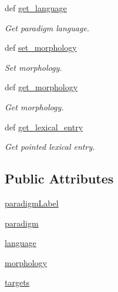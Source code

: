 \begin{DoxyCompactItemize}
def \hyperlink{classlmf_1_1src_1_1morphosyntax_1_1paradigm_1_1_paradigm_a7ba7ef75fdd20edfddc8821c7d4eca9a}{get\+\_\+language}
\begin{DoxyCompactList}\small\item\em Get paradigm language. \end{DoxyCompactList}\item 
def \hyperlink{classlmf_1_1src_1_1morphosyntax_1_1paradigm_1_1_paradigm_a40a98ba766025f62f839299c4084666c}{set\+\_\+morphology}
\begin{DoxyCompactList}\small\item\em Set morphology. \end{DoxyCompactList}\item 
def \hyperlink{classlmf_1_1src_1_1morphosyntax_1_1paradigm_1_1_paradigm_a7f8b86d83993a56e5dd46a7924f130b4}{get\+\_\+morphology}
\begin{DoxyCompactList}\small\item\em Get morphology. \end{DoxyCompactList}\item 
def \hyperlink{classlmf_1_1src_1_1morphosyntax_1_1paradigm_1_1_paradigm_aa9cc39604cd3b3d06e1d142016db3541}{get\+\_\+lexical\+\_\+entry}
\begin{DoxyCompactList}\small\item\em Get pointed lexical entry. \end{DoxyCompactList}\end{DoxyCompactItemize}
\subsection*{Public Attributes}
\begin{DoxyCompactItemize}
\item 
\hyperlink{classlmf_1_1src_1_1morphosyntax_1_1paradigm_1_1_paradigm_a5892a515d2311d4c03b180603a0d2929}{paradigm\+Label}
\item 
\hyperlink{classlmf_1_1src_1_1morphosyntax_1_1paradigm_1_1_paradigm_a2c706c0653324f536c9fc8b20d5dbf15}{paradigm}
\item 
\hyperlink{classlmf_1_1src_1_1morphosyntax_1_1paradigm_1_1_paradigm_a536c9155740d0363044389ce31dff090}{language}
\item 
\hyperlink{classlmf_1_1src_1_1morphosyntax_1_1paradigm_1_1_paradigm_a7c9c944b764a0351f0e58234b48bdf86}{morphology}
\item 
\hyperlink{classlmf_1_1src_1_1morphosyntax_1_1paradigm_1_1_paradigm_a546af1d9fc21b3b1a6d102e39877a587}{targets}
\end{DoxyCompactItemize}


